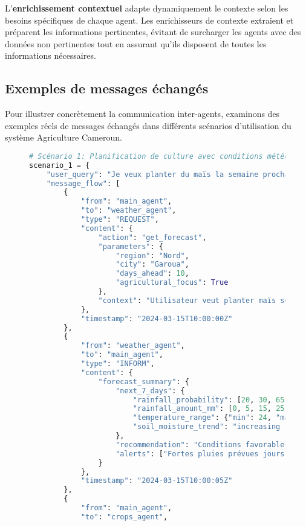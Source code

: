 L'\textbf{enrichissement contextuel} adapte dynamiquement le contexte selon les besoins spécifiques de chaque agent. Les enrichisseurs de contexte extraient et préparent les informations pertinentes, évitant de surcharger les agents avec des données non pertinentes tout en assurant qu'ils disposent de toutes les informations nécessaires.

\subsection{Exemples de messages échangés}

Pour illustrer concrètement la communication inter-agents, examinons des exemples réels de messages échangés dans différents scénarios d'utilisation du système Agriculture Cameroun.

\begin{figure}[h]
\centering
\begin{lstlisting}[language=Python, caption=Exemples de communications inter-agents en action]
# Scénario 1: Planification de culture avec conditions météo
scenario_1 = {
    "user_query": "Je veux planter du maïs la semaine prochaine à Garoua",
    "message_flow": [
        {
            "from": "main_agent",
            "to": "weather_agent",
            "type": "REQUEST",
            "content": {
                "action": "get_forecast",
                "parameters": {
                    "region": "Nord",
                    "city": "Garoua",
                    "days_ahead": 10,
                    "agricultural_focus": True
                },
                "context": "Utilisateur veut planter maïs semaine prochaine"
            },
            "timestamp": "2024-03-15T10:00:00Z"
        },
        {
            "from": "weather_agent",
            "to": "main_agent",
            "type": "INFORM",
            "content": {
                "forecast_summary": {
                    "next_7_days": {
                        "rainfall_probability": [20, 30, 65, 80, 75, 40, 25],
                        "rainfall_amount_mm": [0, 5, 15, 25, 20, 8, 3],
                        "temperature_range": {"min": 24, "max": 38},
                        "soil_moisture_trend": "increasing from day 3"
                    },
                    "recommendation": "Conditions favorables à partir du jour 3",
                    "alerts": ["Fortes pluies prévues jours 4-5"]
                }
            },
            "timestamp": "2024-03-15T10:00:05Z"
        },
        {
            "from": "main_agent",
            "to": "crops_agent",

\end{lstlisting}
\end{figure}
